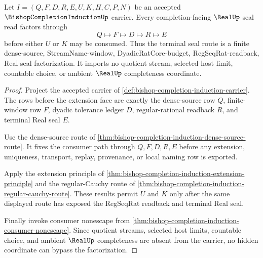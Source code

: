 \begin{theorem}
\label{thm:bishop-completion-induction-limit-seal-factorization}
Let $I=(Q,F,D,R,E,U,K,H,C,P,N)$ be an accepted $\BishopCompletionInductionUp$ carrier. Every completion-facing $\RealUp$ seal read factors through
$$
Q \longmapsto F \longmapsto D \longmapsto R \longmapsto E
$$
before either $U$ or $K$ may be consumed. Thus the terminal seal route is a finite dense-source, StreamName-window, DyadicRatCore-budget, RegSeqRat-readback, Real-seal factorization. It imports no quotient stream, selected host limit, countable choice, or ambient $\RealUp$ completeness coordinate.
\end{theorem}
\begin{proof}
Project the accepted carrier of \autoref{def:bishop-completion-induction-carrier}. The rows before the extension face are exactly the dense-source row $Q$, finite-window row $F$, dyadic tolerance ledger $D$, regular-rational readback $R$, and terminal Real seal $E$.

Use the dense-source route of \autoref{thm:bishop-completion-induction-dense-source-route}. It fixes the consumer path through $Q,F,D,R,E$ before any extension, uniqueness, transport, replay, provenance, or local naming row is exported.

Apply the extension principle of \autoref{thm:bishop-completion-induction-extension-principle} and the regular-Cauchy route of \autoref{thm:bishop-completion-induction-regular-cauchy-route}. These results permit $U$ and $K$ only after the same displayed route has exposed the RegSeqRat readback and terminal Real seal.

Finally invoke consumer nonescape from \autoref{thm:bishop-completion-induction-consumer-nonescape}. Since quotient streams, selected host limits, countable choice, and ambient $\RealUp$ completeness are absent from the carrier, no hidden coordinate can bypass the factorization.
\end{proof}


